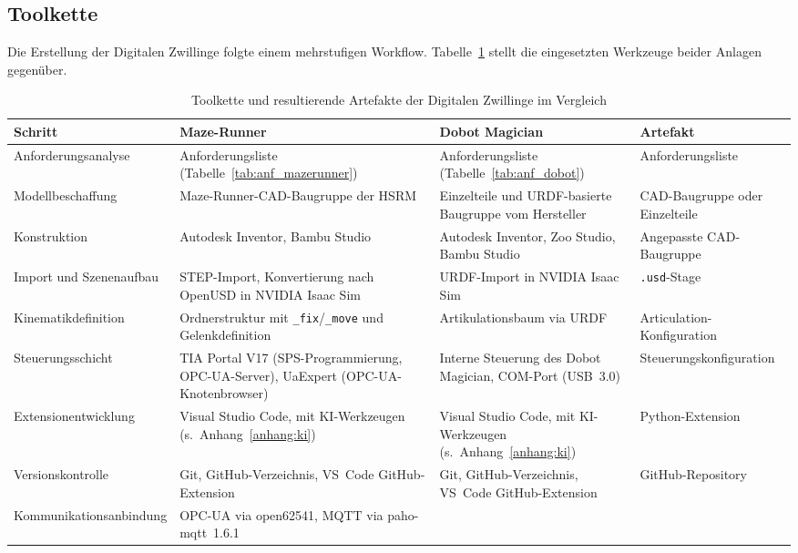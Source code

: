 \subsection{Toolkette}
Die Erstellung der Digitalen Zwillinge folgte einem mehrstufigen Workflow.
Tabelle~\ref{tab:toolkette} stellt die eingesetzten Werkzeuge beider Anlagen gegenüber.

\begin{table}[H]
\centering
\caption{Toolkette und resultierende Artefakte der Digitalen Zwillinge im Vergleich}
\label{tab:toolkette}
\begin{tabularx}{\linewidth}{p{2.6cm}XXp{2.9cm}}
\toprule
\textbf{Schritt} & \textbf{Maze-Runner} & \textbf{Dobot Magician} & \textbf{Artefakt} \\
\midrule
Anforderungs\-analyse
  & Anforderungsliste (Tabelle~\ref{tab:anf_mazerunner})
  & Anforderungsliste (Tabelle~\ref{tab:anf_dobot})
  & Anforderungs\-liste \\
\addlinespace
Modell\-beschaffung
  & Maze-Runner-CAD-Baugruppe der HSRM
  & Einzelteile und URDF-basierte Baugruppe vom Hersteller
  & CAD-Baugruppe oder Einzelteile \\
\addlinespace
Konstruktion
  & Autodesk Inventor, Bambu Studio
  & Autodesk Inventor, Zoo Studio, Bambu Studio
  & Angepasste CAD-Baugruppe \\
\addlinespace
Import und Szenen\-aufbau
  & STEP-Import, Konvertierung nach OpenUSD in NVIDIA Isaac Sim
  & URDF-Import in NVIDIA Isaac Sim
  & \texttt{.usd}-Stage \\
\addlinespace
Kinematik\-definition
  & Ordner\-struktur mit \texttt{\_fix}/\texttt{\_move} und Gelenk\-definition
  & Artikulationsbaum via URDF
  & Articulation-Konfiguration \\
\addlinespace
Steuerungs\-schicht
  & TIA Portal V17 (SPS-Programmierung, OPC-UA-Server), UaExpert (OPC-UA-Knotenbrowser)
  & Interne Steuerung des Dobot Magician, COM-Port (USB~3.0)
  & Steuerungs\-konfiguration \\
\addlinespace
Extension\-entwicklung
  & Visual Studio Code, mit KI-Werkzeugen (s.\ Anhang~\ref{anhang:ki})
  & Visual Studio Code, mit KI-Werkzeugen (s.\ Anhang~\ref{anhang:ki})
  & Python-Extension \\
\addlinespace
Versions\-kontrolle
  & Git, GitHub-Verzeichnis, VS~Code GitHub-Extension
  & Git, GitHub-Verzeichnis, VS~Code GitHub-Extension
  & GitHub-Repository \\
\addlinespace
Kommunikations\-anbindung
  & OPC-UA via open62541, MQTT via paho-mqtt~1.6.1

\end{tabularx}
\end{table}

